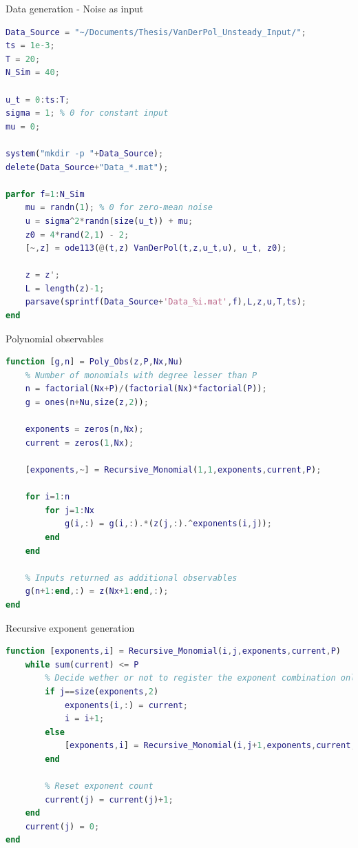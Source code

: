 \documentclass{beamer}
\begin{document}
\begin{frame}[fragile]{Data generation - Noise as input}
    \begin{lstlisting}[language=Matlab,basicstyle=\tiny]
Data_Source = "~/Documents/Thesis/VanDerPol_Unsteady_Input/";
ts = 1e-3;
T = 20;
N_Sim = 40;

u_t = 0:ts:T;
sigma = 1; % 0 for constant input
mu = 0;

system("mkdir -p "+Data_Source);
delete(Data_Source+"Data_*.mat");

parfor f=1:N_Sim
    mu = randn(1); % 0 for zero-mean noise
    u = sigma^2*randn(size(u_t)) + mu;
    z0 = 4*rand(2,1) - 2;
    [~,z] = ode113(@(t,z) VanDerPol(t,z,u_t,u), u_t, z0);
    
    z = z';
    L = length(z)-1;
    parsave(sprintf(Data_Source+'Data_%i.mat',f),L,z,u,T,ts);
end
    \end{lstlisting}
\end{frame}

\begin{frame}[fragile]{Polynomial observables}
    \begin{lstlisting}[language=Matlab,basicstyle=\tiny]
function [g,n] = Poly_Obs(z,P,Nx,Nu)
    % Number of monomials with degree lesser than P
    n = factorial(Nx+P)/(factorial(Nx)*factorial(P));
    g = ones(n+Nu,size(z,2));

    exponents = zeros(n,Nx);
    current = zeros(1,Nx);

    [exponents,~] = Recursive_Monomial(1,1,exponents,current,P);

    for i=1:n
        for j=1:Nx
            g(i,:) = g(i,:).*(z(j,:).^exponents(i,j));
        end
    end
    
    % Inputs returned as additional observables
    g(n+1:end,:) = z(Nx+1:end,:);
end
    \end{lstlisting}
\end{frame}

\begin{frame}[fragile]{Recursive exponent generation}
    \begin{lstlisting}[language=Matlab,basicstyle=\tiny]
function [exponents,i] = Recursive_Monomial(i,j,exponents,current,P)
    while sum(current) <= P
        % Decide wether or not to register the exponent combination only on the deepest level of recursion
        if j==size(exponents,2)
            exponents(i,:) = current;
            i = i+1;
        else
            [exponents,i] = Recursive_Monomial(i,j+1,exponents,current,P);
        end

        % Reset exponent count
        current(j) = current(j)+1;
    end
    current(j) = 0;
end
    \end{lstlisting}
\end{frame}
\end{document}
